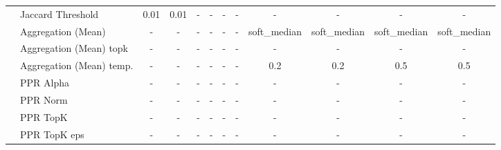 \documentclass[sigconf, review]{acmart}
\begin{document}
{\begin{tabular}{llcccccccccc}
	& Jaccard Threshold& 0.01& 0.01& -& -& -& -& -& -& -& -\\
	& Aggregation (Mean)& -& -& -& -& -& -& soft_median& soft_median& soft_median& soft_median\\
	& Aggregation (Mean) topk& -& -& -& -& -& -& -& -& -& -\\
	& Aggregation (Mean) temp.& -& -& -& -& -& -& 0.2& 0.2& 0.5& 0.5\\
	& PPR Alpha& -& -& -& -& -& -& -& -& -& -\\
	& PPR Norm& -& -& -& -& -& -& -& -& -& -\\
	& PPR TopK& -& -& -& -& -& -& -& -& -& -\\
	& PPR TopK eps& -& -& -& -& -& -& -& -& -& -\\

\bottomrule
\end{tabular}
}

\fi
\end{document}
